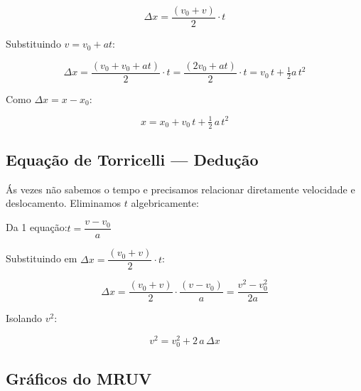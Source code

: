 \documentclass[12pt,a4paper]{article}
\begin{document}
\[
  \Delta x = \frac{(v_0 + v)}{2}\cdot t
\]

Substituindo $v = v_0 + at$:

\[
  \Delta x = \frac{(v_0 + v_0 + at)}{2}\cdot t
           = \frac{(2v_0 + at)}{2}\cdot t
           = v_0\,t + \tfrac{1}{2}a\,t^2
\]

Como $\Delta x = x - x_0$:

\begin{tcolorbox}[formulabox={2\textordfeminine{} Equa\c{c}\~ao do MRUV (equa\c{c}\~ao hor\'aria)}]
  \[
    \boxed{x = x_0 + v_0\,t + \tfrac{1}{2}\,a\,t^2}
  \]
\end{tcolorbox}

\subsection{Equa\c{c}\~ao de Torricelli --- Dedu\c{c}\~ao}

\'{A}s vezes n\~ao sabemos o tempo e precisamos relacionar diretamente
velocidade e deslocamento. Eliminamos $t$ algebricamente:

Da 1\textordfeminine{} equa\c{c}\~ao:\quad $t = \dfrac{v - v_0}{a}$

Substituindo em $\Delta x = \dfrac{(v_0 + v)}{2}\cdot t$:

\[
  \Delta x = \frac{(v_0 + v)}{2}\cdot\frac{(v - v_0)}{a}
           = \frac{v^2 - v_0^2}{2a}
\]

Isolando $v^2$:

\begin{tcolorbox}[formulabox={3\textordfeminine{} Equa\c{c}\~ao do MRUV (Torricelli)}]
  \[
    \boxed{v^2 = v_0^2 + 2\,a\,\Delta x}
  \]
\end{tcolorbox}

\subsection{Gr\'aficos do MRUV}
\end{document}
